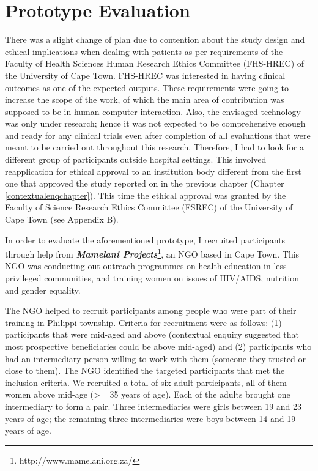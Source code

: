 \section{Prototype Evaluation}
There was a slight change of plan  due to contention about the study design and ethical implications when dealing with patients as per requirements of the Faculty of Health Sciences Human Research Ethics Committee (FHS-HREC) of the University of Cape Town. FHS-HREC was interested in having clinical outcomes as one of the expected outputs. These requirements were going to increase the scope of the work, of which the main area of contribution was supposed to be in human-computer interaction. Also, the envisaged technology was only under research; hence it was not expected to be comprehensive enough and ready for any clinical trials even after completion of all evaluations that were meant to be carried out throughout this research. Therefore, I had to look for a different group of participants outside hospital settings. This involved reapplication for ethical approval to an institution body different from the first one that approved the study reported on in the previous chapter (Chapter \ref{contextualenqchapter}). This time the ethical approval was granted by the Faculty of Science Research Ethics Committee (FSREC) of the University of Cape Town (see Appendix B).

In order to evaluate the aforementioned prototype, I recruited participants through help from \textbf{\textit{Mamelani Projects}}\footnote{http://www.mamelani.org.za/}, an NGO
based in Cape Town. This NGO was conducting out outreach programmes on health education in less-privileged communities, and training women on issues of HIV/AIDS, nutrition and gender equality. 

The NGO helped to recruit participants among people who were part of their training in Philippi township. Criteria for recruitment were as follows: (1) participants that were mid-aged and above (contextual enquiry suggested that most prospective beneficiaries could be above mid-aged) and (2) participants who had an intermediary person willing to work with them (someone they trusted or close to them). The NGO identified the targeted participants that met the inclusion criteria. We recruited a total of six adult participants, all of them women above mid-age (\textgreater= 35 years of age). Each of the adults brought one intermediary to form a pair. Three intermediaries were girls between 19 and 23 years of age; the remaining three intermediaries were boys between 14 and 19 years of age. 


